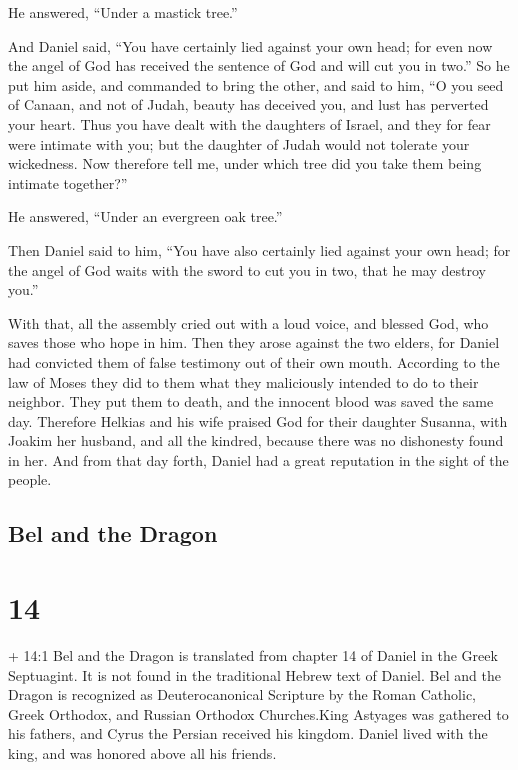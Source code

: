 He answered, ``Under a mastick tree.''

 And Daniel said, ``You have certainly lied against your
own head; for even now the angel of God has received the sentence of God
and will cut you in two.''  So he put him aside, and
commanded to bring the other, and said to him, ``O you seed of Canaan,
and not of Judah, beauty has deceived you, and lust has perverted your
heart.  Thus you have dealt with the daughters of Israel,
and they for fear were intimate with you; but the daughter of Judah
would not tolerate your wickedness.  Now therefore tell me,
under which tree did you take them being intimate together?''

He answered, ``Under an evergreen oak tree.''

 Then Daniel said to him, ``You have also certainly lied
against your own head; for the angel of God waits with the sword to cut
you in two, that he may destroy you.''

 With that, all the assembly cried out with a loud voice,
and blessed God, who saves those who hope in him.  Then
they arose against the two elders, for Daniel had convicted them of
false testimony out of their own mouth.  According to the
law of Moses they did to them what they maliciously intended to do to
their neighbor. They put them to death, and the innocent blood was saved
the same day.  Therefore Helkias and his wife praised God
for their daughter Susanna, with Joakim her husband, and all the
kindred, because there was no dishonesty found in her.  And
from that day forth, Daniel had a great reputation in the sight of the
people.

\hypertarget{bel-and-the-dragon}{%
\subsection{Bel and the Dragon}\label{bel-and-the-dragon}}

\hypertarget{section-13}{%
\section{14}\label{section-13}}

 + 14:1 Bel and the Dragon is translated from chapter 14 of
Daniel in the Greek Septuagint. It is not found in the traditional
Hebrew text of Daniel. Bel and the Dragon is recognized as
Deuterocanonical Scripture by the Roman Catholic, Greek Orthodox, and
Russian Orthodox Churches.King Astyages was gathered to his fathers, and
Cyrus the Persian received his kingdom.  Daniel lived with
the king, and was honored above all his friends.

